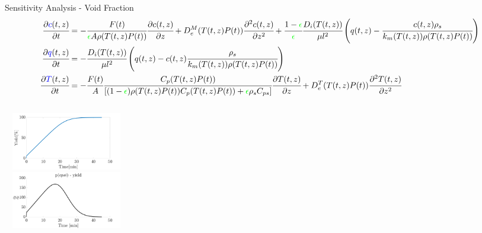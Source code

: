 \documentclass[8pt]{beamer}
\begin{document}
	\begin{frame}[fragile]{Sensitivity Analysis - Void Fraction}	
		\tiny{
			\begin{align*}
				\cfrac{\partial \textcolor{blue}{c}(t,z)}{\partial t} &=  -\cfrac{F(t)}{\textcolor{green}{\epsilon}A\rho(T(t,z)P(t))} \cfrac{\partial c(t,z)}{\partial z}
				+ D^M_e(T(t,z)P(t)) \cfrac{\partial^2 c(t,z)}{\partial z^2} + \cfrac{1-\textcolor{green}{\epsilon}}{\textcolor{green}{\epsilon}} 	\cfrac{D_i(T(t,z))}{\mu l^2 }\left(q(t,z) - \cfrac{c(t,z)\rho_s}{k_m(T(t,z))\rho(T(t,z)P(t))} \right)\\
				\cfrac{\partial \textcolor{blue}{q}(t,z)}{\partial t} &= -\cfrac{D_i(T(t,z))}{\mu l^2}\left(q(t,z) - c(t,z) 	\cfrac{\rho_s}{k_m(T(t,z))\rho(T(t,z)P(t))} \right)\\
				\cfrac{\partial \textcolor{blue}{T}(t,z)}{\partial t} &= -\cfrac{F(t)}{A} \cfrac{C_p(T(t,z)P(t))}{ 	[(1-\textcolor{green}{\epsilon})\rho(T(t,z)P(t)) C_p(T(t,z)P(t)) + \textcolor{green}{ \epsilon}\rho_s C_{ps} ]} \cfrac{\partial T(t,z)}{\partial z} 
				+  D^T_e(T(t,z)P(t)) \cfrac{\partial^2 T(t,z)}{\partial z^2}\\
		\end{align*}}		
		\begin{columns}[t]
			\centering
			\includegraphics[width=5.5cm,height=2.5cm]{Figures/Sensitivity/Yield.png}\\
			\centering
			\includegraphics[width=5.5cm,height=2.5cm]{Figures/Sensitivity/Plots/1_SS_R_epsi.png}\\
		\end{columns}	
	\end{frame}
\end{document}
